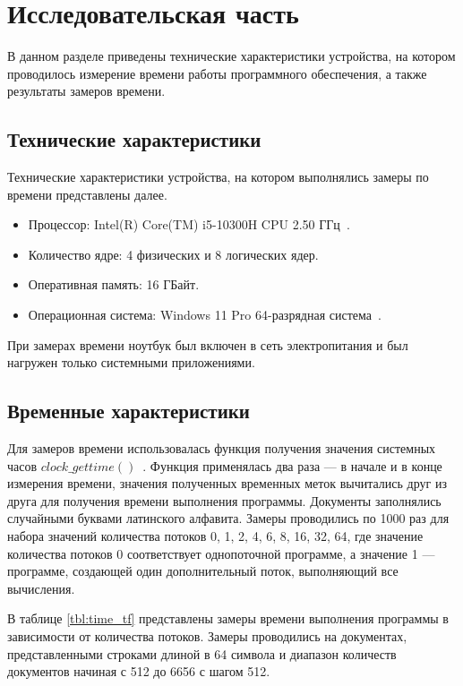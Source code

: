 \chapter{Исследовательская часть}

В данном разделе приведены технические характеристики устройства, на котором проводилось измерение времени работы программного обеспечения, а также результаты замеров времени.

\section{Технические характеристики}

Технические характеристики устройства, на котором выполнялись замеры по времени представлены далее.

\begin{itemize}[label=---]
	\item Процессор: Intel(R) Core(TM) i5-10300H CPU 2.50 ГГц~\cite{intel}.
	\item Количество ядре: 4 физических и 8 логических ядер.
	\item Оперативная память: 16 ГБайт.
	\item Операционная система: Windows 11 Pro 64-разрядная система~\cite{windows}.
\end{itemize}

При замерах времени ноутбук был включен в сеть электропитания и был нагружен только системными приложениями.

\section{Временные характеристики}

Для замеров времени использовалась функция получения значения системных часов $clock\_gettime()$~\cite{c-lang-time}. Функция применялась два раза --- в начале и в конце измерения времени, значения полученных временных меток вычитались друг из друга для получения времени выполнения программы.
Документы заполнялись случайными буквами латинского алфавита.
Замеры проводились по 1000 раз для набора значений количества потоков 0, 1, 2, 4, 6, 8, 16, 32, 64, где значение количества потоков 0 соответствует однопоточной программе, а значение 1 — программе, создающей один дополнительный поток, выполняющий все вычисления. 

В таблице  \ref{tbl:time_tf} представлены замеры времени выполнения программы в зависимости от количества потоков. Замеры проводились на документах, представленными строками длиной в 64 символа и диапазон количеств документов начиная с 512 до 6656 с шагом 512.

